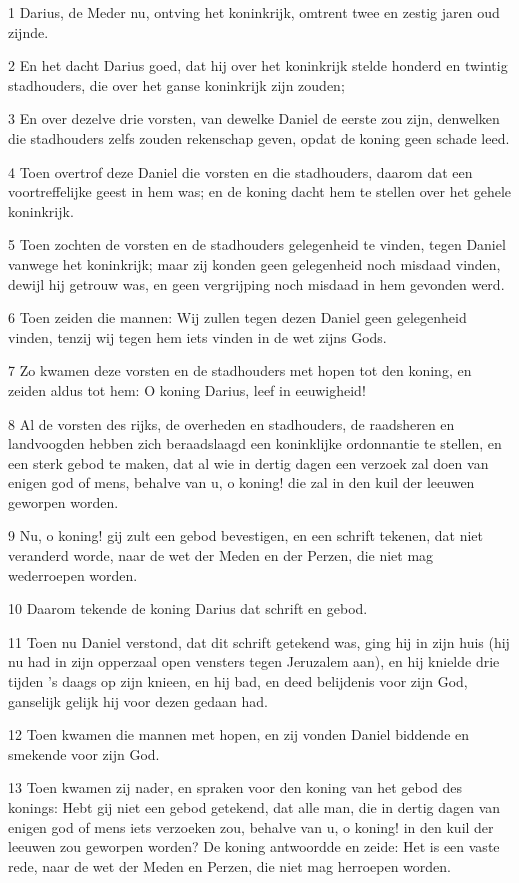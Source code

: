 \par 1 Darius, de Meder nu, ontving het koninkrijk, omtrent twee en zestig jaren oud zijnde.
\par 2 En het dacht Darius goed, dat hij over het koninkrijk stelde honderd en twintig stadhouders, die over het ganse koninkrijk zijn zouden;
\par 3 En over dezelve drie vorsten, van dewelke Daniel de eerste zou zijn, denwelken die stadhouders zelfs zouden rekenschap geven, opdat de koning geen schade leed.
\par 4 Toen overtrof deze Daniel die vorsten en die stadhouders, daarom dat een voortreffelijke geest in hem was; en de koning dacht hem te stellen over het gehele koninkrijk.
\par 5 Toen zochten de vorsten en de stadhouders gelegenheid te vinden, tegen Daniel vanwege het koninkrijk; maar zij konden geen gelegenheid noch misdaad vinden, dewijl hij getrouw was, en geen vergrijping noch misdaad in hem gevonden werd.
\par 6 Toen zeiden die mannen: Wij zullen tegen dezen Daniel geen gelegenheid vinden, tenzij wij tegen hem iets vinden in de wet zijns Gods.
\par 7 Zo kwamen deze vorsten en de stadhouders met hopen tot den koning, en zeiden aldus tot hem: O koning Darius, leef in eeuwigheid!
\par 8 Al de vorsten des rijks, de overheden en stadhouders, de raadsheren en landvoogden hebben zich beraadslaagd een koninklijke ordonnantie te stellen, en een sterk gebod te maken, dat al wie in dertig dagen een verzoek zal doen van enigen god of mens, behalve van u, o koning! die zal in den kuil der leeuwen geworpen worden.
\par 9 Nu, o koning! gij zult een gebod bevestigen, en een schrift tekenen, dat niet veranderd worde, naar de wet der Meden en der Perzen, die niet mag wederroepen worden.
\par 10 Daarom tekende de koning Darius dat schrift en gebod.
\par 11 Toen nu Daniel verstond, dat dit schrift getekend was, ging hij in zijn huis (hij nu had in zijn opperzaal open vensters tegen Jeruzalem aan), en hij knielde drie tijden 's daags op zijn knieen, en hij bad, en deed belijdenis voor zijn God, ganselijk gelijk hij voor dezen gedaan had.
\par 12 Toen kwamen die mannen met hopen, en zij vonden Daniel biddende en smekende voor zijn God.
\par 13 Toen kwamen zij nader, en spraken voor den koning van het gebod des konings: Hebt gij niet een gebod getekend, dat alle man, die in dertig dagen van enigen god of mens iets verzoeken zou, behalve van u, o koning! in den kuil der leeuwen zou geworpen worden? De koning antwoordde en zeide: Het is een vaste rede, naar de wet der Meden en Perzen, die niet mag herroepen worden.
